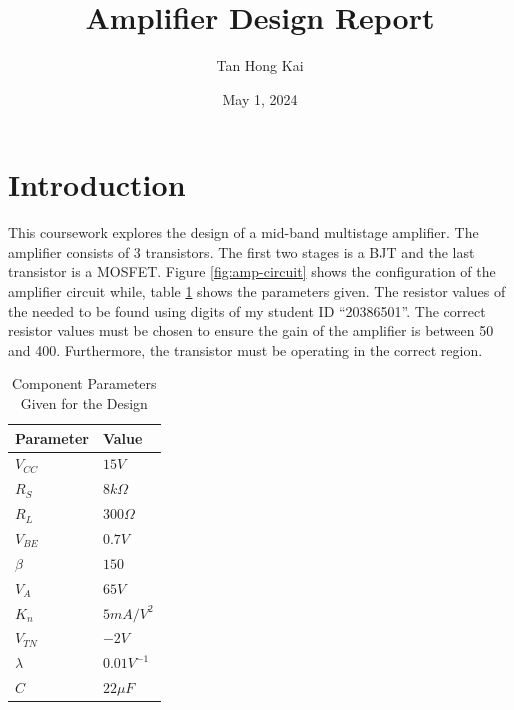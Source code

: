 \documentclass{article}
\title{Amplifier Design Report}
\author{Tan Hong Kai}
\date{May 1, 2024}
\begin{document}
\maketitle

\section{Introduction}

This coursework explores the design of a mid-band multistage amplifier.
The amplifier consists of 3 transistors.
The first two stages is a BJT and the last transistor is a MOSFET.
Figure \ref{fig:amp-circuit} shows the configuration of the amplifier circuit while, table \ref{tab:component-parameters} shows the parameters given.
The resistor values of the needed to be found using digits of my student ID “20386501”.
The correct resistor values must be chosen to ensure the gain of the amplifier is between 50 and 400.
Furthermore, the transistor must be operating in the correct region.

\begin{table}[h]
    \caption{Component Parameters Given for the Design}
    \label{tab:component-parameters}
    \centering
    \begin{tabular}{ l l }
        \hline
        Parameter & Value         \\
        \hline
        $V_{CC}$  & $15 V$        \\
        $R_{S}$   & $8 k\Omega$   \\
        $R_{L}$   & $300 \Omega$  \\
        $V_{BE}$  & $0.7 V$       \\
        $\beta$   & $150$         \\
        $V_{A}$   & $65 V$        \\
        $K_{n}$   & $5 mA/V^{2}$  \\
        $V_{TN}$  & $-2 V$        \\
        $\lambda$ & $0.01 V^{-1}$ \\
        $C$       & $22 \mu{F}$   \\
        \hline
    \end{tabular}
\end{table}
\end{document}
